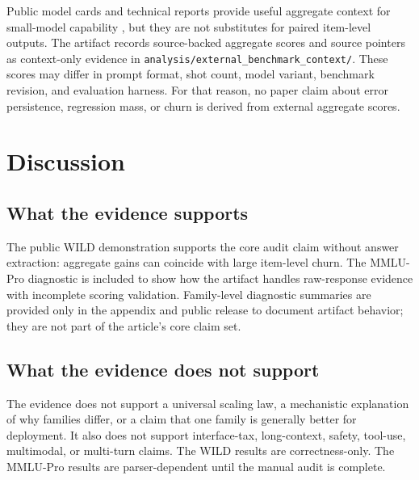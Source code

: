 \documentclass[manuscript, screen, review, nonacm]{jair}
\begin{document}
\begin{table}[t]
\centering
\small
\resizebox{\linewidth}{!}{}
\caption{External evidence map used by the artifact. Only Tier A/B item-level sources can support replacement-accounting metrics. Tier C sources are context only, and Tier D sources are logged as exclusions unless access is later granted.}
\label{tab:external-claim-use}
\end{table}

Public model cards and technical reports provide useful aggregate context for small-model capability \parencite{qwen25technicalreport,qwen3technicalreport,gemma2technicalreport,gemma3technicalreport,llama3herd}, but they are not substitutes for paired item-level outputs. The artifact records source-backed aggregate scores and source pointers as context-only evidence in \texttt{analysis/external\_benchmark\_context/}. These scores may differ in prompt format, shot count, model variant, benchmark revision, and evaluation harness. For that reason, no paper claim about error persistence, regression mass, or churn is derived from external aggregate scores.

\section{Discussion}

\subsection{What the evidence supports}

The public WILD demonstration supports the core audit claim without answer extraction: aggregate gains can coincide with large item-level churn. The MMLU-Pro diagnostic is included to show how the artifact handles raw-response evidence with incomplete scoring validation. Family-level diagnostic summaries are provided only in the appendix and public release to document artifact behavior; they are not part of the article's core claim set.

\subsection{What the evidence does not support}

The evidence does not support a universal scaling law, a mechanistic explanation of why families differ, or a claim that one family is generally better for deployment. It also does not support interface-tax, long-context, safety, tool-use, multimodal, or multi-turn claims. The WILD results are correctness-only. The MMLU-Pro results are parser-dependent until the manual audit is complete.
\end{document}
